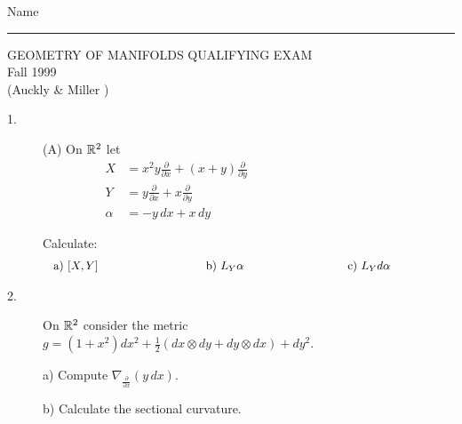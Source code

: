 \documentclass[bbb]{report}
\def\R{{\Bbb R}}
\begin{document}

\begin{large}

\hfill Name \rule{2.5in}{.01in}
\par
\vspace{.1in}

\begin{center}
   GEOMETRY OF MANIFOLDS QUALIFYING EXAM \\
   Fall 1999 \\
   (Auckly \& Miller ) \\
\end{center}


\vspace{.1in}

\begin{large}\begin{center}
\end{center}\end{large}

\vspace{.05in}

\begin{description}

\item[1.] (A)
On $\R^2$ let
$$\begin{array}{rlll}
  X &=x^2y\frac{\partial}{\partial x}+(x+y)\frac{\partial}{\partial y}&
  \qquad\qquad\qquad\qquad\qquad&\\
  Y &=y\frac{\partial}{\partial x}+x\frac{\partial}{\partial y}&&\\
  \alpha &=-y\,dx+x\,dy&&
  \end{array} $$
\item[] Calculate:
$$\begin{array}{lll}
\hbox{ a)  $[X,Y]$ \qquad\qquad\qquad\qquad   }
& \hbox{b) $L_Y \alpha$\qquad\qquad\qquad\qquad}
& \hbox{c) $L_Y d\alpha$\qquad\qquad\qquad\qquad}
 \end{array}$$

\vspace{.25in}

\item[2.]
On $\R^2$ consider the metric
$g=(1+x^2)dx^2+\frac{1}{2} (dx\otimes dy+dy\otimes dx)+dy^2$.

\item[\quad] a) Compute $\nabla_{\frac{\partial}{\partial x}}(y\,dx)$.
\item[\quad] b) Calculate the sectional curvature.


\end{description}
\end{large}
\end{document}
